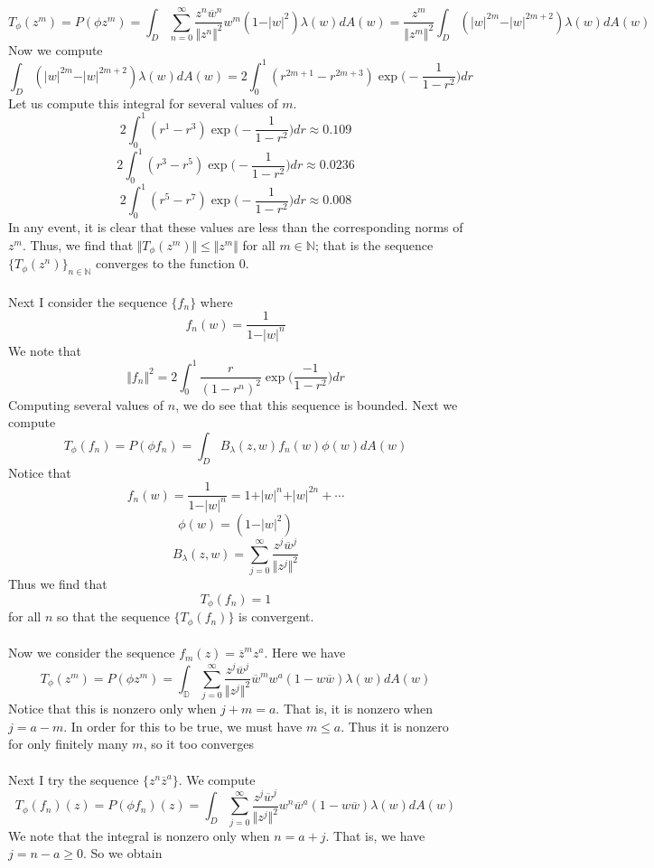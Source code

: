 \documentclass[12pt]{article}
\newcommand{\N}{\mathbb{N}}
\begin{document}
\[
T_\phi(z^m) =  P(\phi z^m) = \int_D \sum_{n=0}^\infty \frac{z^n \overline{w}^n}{\Vert z^n \Vert^2} w^m (1 - \vert w \vert^2) \lambda(w) dA(w) = \frac{z^m}{\Vert z^m \Vert^2} \int_D (\vert w \vert^{2m} - \vert w \vert^{2m+2}) \lambda(w) dA(w)
\] Now we compute
\[
\int_D (\vert w \vert^{2m} - \vert w \vert^{2m+2}) \lambda(w) dA(w) = 2 \int_0^1 (r^{2m+1} -  r^{2m+3}) \exp\bigg(-\frac{1}{1-r^2}\bigg) dr
\] Let us compute this integral for several values of $m$.
\[
2 \int_0^1 (r^{1} -  r^{3}) \exp\bigg(-\frac{1}{1-r^2}\bigg) dr \approx 0.109
\]
\[
2 \int_0^1 (r^{3} -  r^{5}) \exp\bigg(-\frac{1}{1-r^2}\bigg) dr \approx 0.0236
\]
\[
2 \int_0^1 (r^{5} -  r^{7}) \exp\bigg(-\frac{1}{1-r^2}\bigg) dr \approx 0.008
\] In any event, it is clear that these values are less than the corresponding norms of $z^m$. Thus, we find that $\Vert T_\phi(z^m) \Vert \leq \Vert z^m \Vert$ for all $m \in \N$; that is the sequence $\{T_\phi(z^n)\}_{n \in \N}$ converges to the function $0$.
\\ \\
Next I consider the sequence $\{f_n\}$ where
\[
f_n(w) = \frac{1}{1- \vert w \vert^n}
\] We note that
\[
\Vert f_n \Vert^2 = 2 \int_0^1 \frac{r}{(1-r^n)^2} \exp\bigg(\frac{-1}{1-r^2}\bigg) dr
\] Computing several values of $n$, we do see that this sequence is bounded. Next we compute
\[
T_\phi(f_n) = P(\phi f_n) = \int_D B_\lambda(z,w) f_n(w) \phi(w) dA(w)
\] Notice that
\[
f_n(w) = \frac{1}{1- \vert w \vert ^n} = 1 + \vert w \vert^n + \vert w \vert^{2n} + \cdots
\]
\[
\phi(w) = (1-\vert w \vert^2)
\] 
\[
B_\lambda(z,w)  = \sum_{j=0}^\infty \frac{z^j \overline{w}^j}{\Vert z^j \Vert ^2}
\] Thus we find that
\[
T_\phi(f_n) = 1
\] for all $n$ so that the sequence $\{T_\phi(f_n)\}$ is convergent.
\\ \\
Now we consider the sequence $f_m(z) = \overline{z}^m z^{a}$. Here we have
\[
T_\phi(z^m) = P(\phi z^m) = \int_\mathbb{D} \sum_{j=0}^\infty \frac{z^j \overline{w}^j}{\Vert z^j \Vert^2} \overline{w}^m w^a (1-w\overline{w}) \lambda(w) dA(w)
\] Notice that this is nonzero only when $j+m = a$. That is, it is nonzero when $j = a - m$. In order for this to be true, we must have $m \leq a$. Thus it is nonzero for only finitely many $m$, so it too converges
\\ \\
Next I try the sequence $\{z^n\overline{z}^a\}$. We compute 
\[
T_\phi(f_n)(z) = P(\phi f_n)(z) = \int_D \sum_{j=0}^\infty \frac{z^j \overline{w}^j}{\Vert z^j \Vert^2} w^n \overline{w}^a (1-w \overline{w}) \lambda(w) dA(w)
\] We note that the integral is nonzero only when $n =  a + j$. That is, we have $j = n - a \geq 0$. So we obtain
\end{document}
